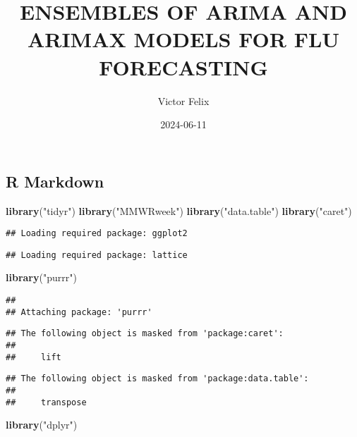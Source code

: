 \documentclass[
]{article}
\title{ENSEMBLES OF ARIMA AND ARIMAX MODELS FOR FLU FORECASTING}
\author{Victor Felix}
\date{2024-06-11}
\newenvironment{Shaded}{\begin{snugshade}}{\end{snugshade}}
\newcommand{\FunctionTok}[1]{\textcolor[rgb]{0.13,0.29,0.53}{\textbf{#1}}}
\newcommand{\NormalTok}[1]{#1}
\newcommand{\StringTok}[1]{\textcolor[rgb]{0.31,0.60,0.02}{#1}}
\begin{document}
\maketitle

\hypertarget{r-markdown}{%
\subsection{R Markdown}\label{r-markdown}}

\begin{Shaded}
\begin{Highlighting}[]
\FunctionTok{library}\NormalTok{(}\StringTok{"tidyr"}\NormalTok{)}
\FunctionTok{library}\NormalTok{(}\StringTok{"MMWRweek"}\NormalTok{)}
\FunctionTok{library}\NormalTok{(}\StringTok{"data.table"}\NormalTok{)}
\FunctionTok{library}\NormalTok{(}\StringTok{"caret"}\NormalTok{)}
\end{Highlighting}
\end{Shaded}

\begin{verbatim}
## Loading required package: ggplot2
\end{verbatim}

\begin{verbatim}
## Loading required package: lattice
\end{verbatim}

\begin{Shaded}
\begin{Highlighting}[]
\FunctionTok{library}\NormalTok{(}\StringTok{"purrr"}\NormalTok{)}
\end{Highlighting}
\end{Shaded}

\begin{verbatim}
## 
## Attaching package: 'purrr'
\end{verbatim}

\begin{verbatim}
## The following object is masked from 'package:caret':
## 
##     lift
\end{verbatim}

\begin{verbatim}
## The following object is masked from 'package:data.table':
## 
##     transpose
\end{verbatim}

\begin{Shaded}
\begin{Highlighting}[]
\FunctionTok{library}\NormalTok{(}\StringTok{"dplyr"}\NormalTok{)}
\end{Highlighting}
\end{Shaded}
\end{document}
